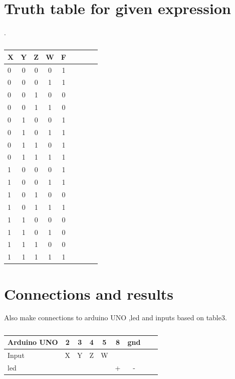 \documentclass[10pt, a4paper]{article}
\begin{document}
\section{Truth table for given expression}
.
\begin{table}[htbp]
 \begin{center}
    \begin{tabular}{|l|c|c|c|c|c|c|c|c} \hline \textbf{X}
  & \textbf{Y} & \textbf{Z} & \textbf{W}& \textbf{F} \\
 \hline
        0&0&0&0&1 \\
        \hline
        0&0&0&1&1 \\
        \hline
        0&0&1&0&0 \\
        \hline
        0&0&1&1&0 \\
        \hline
        0&1&0&0&1 \\
        \hline
        0&1&0&1&1 \\
        \hline
        0&1&1&0&1 \\
        \hline
        0&1&1&1&1 \\
        \hline
        1&0&0&0&1 \\
        \hline
        1&0&0&1&1 \\
        \hline
        1&0&1&0&0 \\
        \hline
        1&0&1&1&1 \\
        \hline
        1&1&0&0&0 \\
        \hline
        1&1&0&1&0 \\
        \hline
        1&1&1&0&0 \\
        \hline
        1&1&1&1&1 \\
        \hline
\end{tabular}   
\end{center}
\caption{\label{table:dummytable} }
\end{table}







\section{Connections and results}



Also make connections to arduino UNO ,led and inputs based on table3. 

\begin{table}[htbp]
 \begin{center}
    \begin{tabular}{|l|c|c|c|c|c|c|c|c} \hline \textbf{Arduino UNO}
  & \textbf{2} & \textbf{3} & \textbf{4}& \textbf{5}& \textbf{8}& \textbf{gnd} \\
 \hline
Input&X&Y&Z&W&&\\ \hline
led&&&&&+&- \\ \hline
\end{tabular}   
\end{center}
\caption{\label{table:dummytable} }
\end{table}
\end{document}
